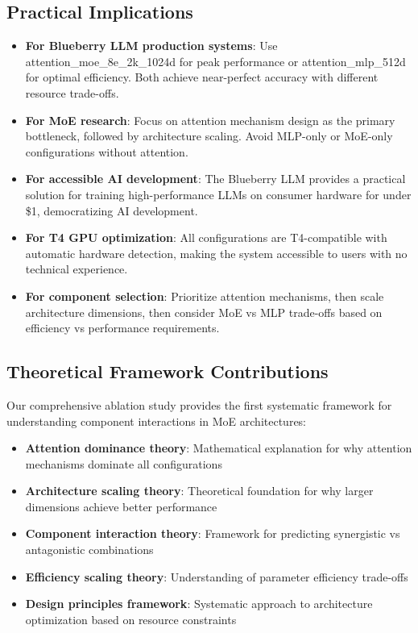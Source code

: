 \documentclass[11pt,a4paper]{article}
\begin{document}
\subsection{Practical Implications}

\begin{itemize}
    \item \textbf{For Blueberry LLM production systems}: Use attention\_moe\_8e\_2k\_1024d for peak performance or attention\_mlp\_512d for optimal efficiency. Both achieve near-perfect accuracy with different resource trade-offs.
    \item \textbf{For MoE research}: Focus on attention mechanism design as the primary bottleneck, followed by architecture scaling. Avoid MLP-only or MoE-only configurations without attention.
    \item \textbf{For accessible AI development}: The Blueberry LLM provides a practical solution for training high-performance LLMs on consumer hardware for under \$1, democratizing AI development.
    \item \textbf{For T4 GPU optimization}: All configurations are T4-compatible with automatic hardware detection, making the system accessible to users with no technical experience.
    \item \textbf{For component selection}: Prioritize attention mechanisms, then scale architecture dimensions, then consider MoE vs MLP trade-offs based on efficiency vs performance requirements.
\end{itemize}

\subsection{Theoretical Framework Contributions}

Our comprehensive ablation study provides the first systematic framework for understanding component interactions in MoE architectures:

\begin{itemize}
    \item \textbf{Attention dominance theory}: Mathematical explanation for why attention mechanisms dominate all configurations
    \item \textbf{Architecture scaling theory}: Theoretical foundation for why larger dimensions achieve better performance
    \item \textbf{Component interaction theory}: Framework for predicting synergistic vs antagonistic combinations
    \item \textbf{Efficiency scaling theory}: Understanding of parameter efficiency trade-offs
    \item \textbf{Design principles framework}: Systematic approach to architecture optimization based on resource constraints
\end{itemize}
\end{document}
